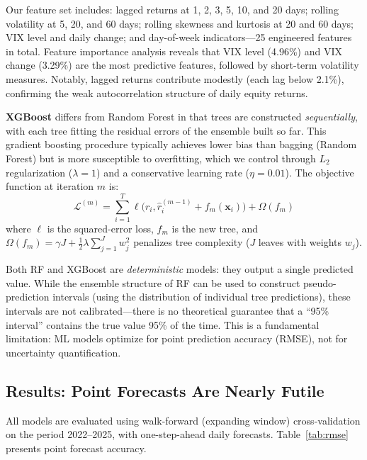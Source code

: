 \documentclass[11pt,a4paper]{article}
\begin{document}
Our feature set includes: lagged returns at 1, 2, 3, 5, 10, and 20 days; rolling volatility at 5, 20, and 60 days; rolling skewness and kurtosis at 20 and 60 days; VIX level and daily change; and day-of-week indicators---25 engineered features in total.
Feature importance analysis reveals that VIX level (4.96\%) and VIX change (3.29\%) are the most predictive features, followed by short-term volatility measures.
Notably, lagged returns contribute modestly (each lag below 2.1\%), confirming the weak autocorrelation structure of daily equity returns.

\textbf{XGBoost} \citep{chen2016} differs from Random Forest in that trees are constructed \emph{sequentially}, with each tree fitting the residual errors of the ensemble built so far.
This gradient boosting procedure typically achieves lower bias than bagging (Random Forest) but is more susceptible to overfitting, which we control through $L_2$ regularization ($\lambda = 1$) and a conservative learning rate ($\eta = 0.01$).
The objective function at iteration $m$ is:
\begin{equation}
\label{eq:xgb}
\mathcal{L}^{(m)} = \sum_{i=1}^{T} \ell\bigl(r_i, \hat{r}_i^{(m-1)} + f_m(\mathbf{x}_i)\bigr) + \Omega(f_m)
\end{equation}
where $\ell$ is the squared-error loss, $f_m$ is the new tree, and $\Omega(f_m) = \gamma J + \frac{1}{2}\lambda \sum_{j=1}^{J} w_j^2$ penalizes tree complexity ($J$ leaves with weights $w_j$).

Both RF and XGBoost are \emph{deterministic} models: they output a single predicted value.
While the ensemble structure of RF can be used to construct pseudo-prediction intervals (using the distribution of individual tree predictions), these intervals are not calibrated---there is no theoretical guarantee that a ``95\% interval'' contains the true value 95\% of the time.
This is a fundamental limitation: ML models optimize for point prediction accuracy (RMSE), not for uncertainty quantification.

\subsection{Results: Point Forecasts Are Nearly Futile}
\label{sec:det_results}

All models are evaluated using walk-forward (expanding window) cross-validation on the period 2022--2025, with one-step-ahead daily forecasts.
Table~\ref{tab:rmse} presents point forecast accuracy.
\end{document}
